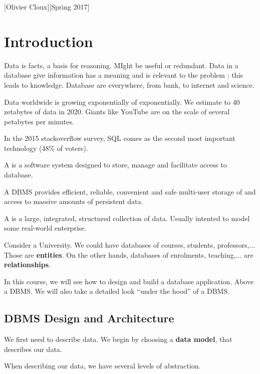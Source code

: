 \documentclass[11pt,a4paper]{article}
\begin{document}
[Olivier Cloux][Spring 2017]
\tableofcontents

\section{Introduction}
Data is facts, a basis for reasoning. MIght be useful or redundant. Data in a database give information has a meaning and is relevant to the problem ; this leads to knowledge. Database are everywhere, from bank, to internet and science.

Data worldwide is growing exponentially of exponentially. We estimate to 40 zetabytes of data in 2020. Giants like YouTube are on the scale of several petabytes per minutes.

In the 2015 stackoverflow survey, SQL comes as the second most important technology (48\% of voters).
\begin{definition}
    \label{def_dbms}
    A  is a software system designed to store, manage and facilitate access to database.
\end{definition}
A DBMS provides efficient, reliable, convenient and safe multi-user storage of and access to massive amounts of persistent data.

\begin{definition}
    A  is a large, integrated, structured collection of data. Usually intented to model some real-world enterprise.
\end{definition}
\begin{example}
    Consider a University. We could have databases of courses, students, professors,... Those are \textbf{entities}. On the other hands, databases of enrolments, teaching,... are \textbf{relationships}.
\end{example}

In this course, we will see how to design and build a database application. Above a DBMS. We will also take a detailed look ``under the hood'' of a DBMS.

\subsection{DBMS Design and Architecture}
We first need to describe data. We begin by choosing a \textbf{data model}, that describes our data. 

When describing our data, we have several levels of abstraction. 
\end{document}
